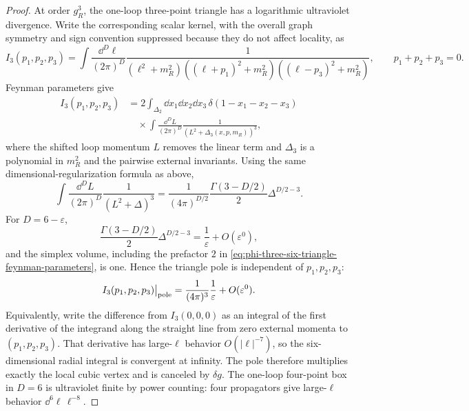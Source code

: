 \begin{proof}
At order \(g_R^3\), the one-loop three-point triangle has a logarithmic
ultraviolet divergence.  Write the corresponding scalar kernel, with the
overall graph symmetry and sign convention suppressed because they do not
affect locality, as
\begin{equation}
  I_3(p_1,p_2,p_3)
  =
  \int\frac{\dd^D\ell}{(2\pi)^D}
  \frac{1}
  {(\ell^2+m_R^2)((\ell+p_1)^2+m_R^2)((\ell-p_3)^2+m_R^2)},
  \qquad p_1+p_2+p_3=0 .
  \label{eq:phi-three-six-triangle-kernel}
\end{equation}
Feynman parameters give
\begin{equation}
\begin{aligned}
  I_3(p_1,p_2,p_3)
  &=
  2\int_{\Delta_2}\dd x_1\dd x_2\dd x_3\,
  \delta(1-x_1-x_2-x_3)
\\
  &\quad\times
  \int\frac{\dd^D L}{(2\pi)^D}
  \frac{1}{(L^2+\Delta_3(x,p,m_R))^3},
\end{aligned}
  \label{eq:phi-three-six-triangle-feynman-parameters}
\end{equation}
where the shifted loop momentum \(L\) removes the linear term and
\(\Delta_3\) is a polynomial in \(m_R^2\) and the pairwise external invariants.
Using the same dimensional-regularization formula as above,
\[
  \int\frac{\dd^D L}{(2\pi)^D}\frac1{(L^2+\Delta)^3}
  =
  \frac1{(4\pi)^{D/2}}\frac{\Gamma(3-D/2)}{2}\Delta^{D/2-3}.
\]
For \(D=6-\varepsilon\),
\[
  \frac{\Gamma(3-D/2)}{2}\Delta^{D/2-3}
  =
  \frac{1}{\varepsilon}+O(\varepsilon^0),
\]
and the simplex volume, including the prefactor \(2\) in
\eqref{eq:phi-three-six-triangle-feynman-parameters}, is one.  Hence the
triangle pole is independent of \(p_1,p_2,p_3\):
\begin{equation}
  I_3(p_1,p_2,p_3)\big|_{\rm pole}
  =
  \frac{1}{(4\pi)^3}\frac1{\varepsilon}
  +O(\varepsilon^0).
  \label{eq:phi-three-six-triangle-local-pole}
\end{equation}
Equivalently, write the difference from \(I_3(0,0,0)\) as an integral of the
first derivative of the integrand along the straight line from zero external
momenta to \((p_1,p_2,p_3)\).  That derivative has large-\(\ell\) behavior
\(O(|\ell|^{-7})\), so the six-dimensional radial integral is convergent at
infinity.  The pole therefore multiplies exactly the local cubic vertex and
is canceled by \(\delta g\).  The one-loop four-point box in \(D=6\) is
ultraviolet finite by power counting: four propagators give large-\(\ell\)
behavior \(\dd^6\ell\,\ell^{-8}\).
\end{proof}

